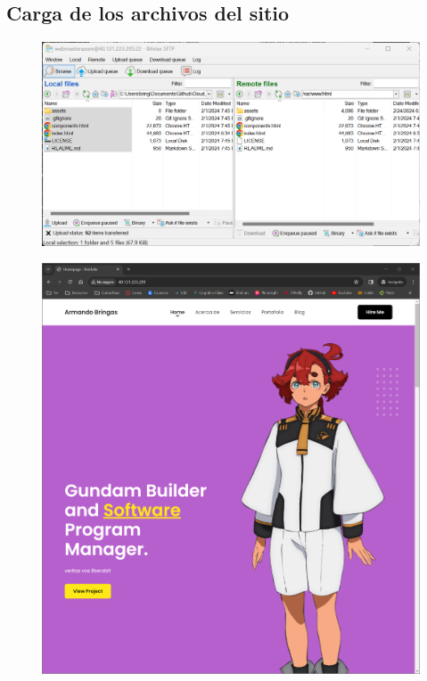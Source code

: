 \documentclass[12pt,a4paper]{article}
\begin{document}
\subsection{Carga de los archivos del sitio}

\begin{figure}[H]
    \centering
    \includegraphics[width=1\linewidth]{M4_Servicios_Cómputo_en_la_Nube/Tarea_5_Creación_Máquinas_Virtuales_en_Nube/reporte/figuras/1_4_1_Carga_archivos.png}
    \label{fig:Azure_7}
\end{figure}

\begin{figure}[H]
    \centering
    \includegraphics[width=1\linewidth]{M4_Servicios_Cómputo_en_la_Nube/Tarea_5_Creación_Máquinas_Virtuales_en_Nube/reporte/figuras/1_4_2_Carga_archivos.png}
    \label{fig:Azure_8}
\end{figure}
\end{document}
